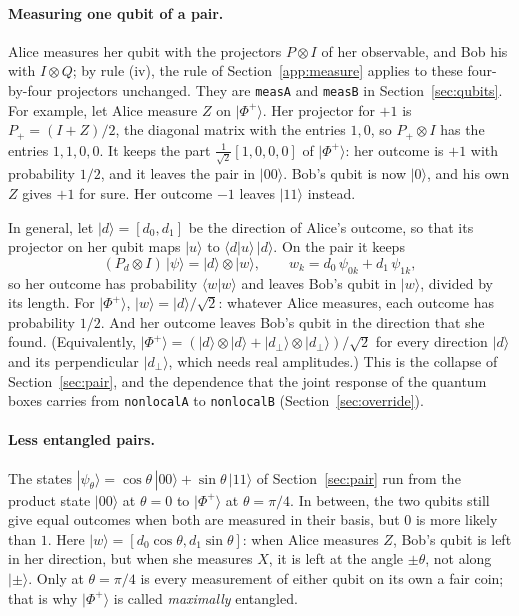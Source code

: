 \documentclass[11pt]{article}
\newcommand{\hs}{\lstinline[style=hask,basicstyle=\ttfamily,frame=none]}
\begin{document}
\paragraph{Measuring one qubit of a pair.} Alice measures her qubit with the projectors $P \otimes I$ of her observable, and Bob his with $I \otimes Q$; by rule (iv), the rule of Section~\ref{app:measure} applies to these four-by-four projectors unchanged. They are \hs|measA| and \hs|measB| in Section~\ref{sec:qubits}. For example, let Alice measure $Z$ on $|\Phi^+\rangle$. Her projector for $+1$ is $P_+ = (I + Z)/2$, the diagonal matrix with the entries $1, 0$, so $P_+ \otimes I$ has the entries $1, 1, 0, 0$. It keeps the part $\frac{1}{\sqrt2}[1, 0, 0, 0]$ of $|\Phi^+\rangle$: her outcome is $+1$ with probability $1/2$, and it leaves the pair in $|00\rangle$. Bob's qubit is now $|0\rangle$, and his own $Z$ gives $+1$ for sure. Her outcome $-1$ leaves $|11\rangle$ instead.

In general, let $|d\rangle = [d_0, d_1]$ be the direction of Alice's outcome, so that its projector on her qubit maps $|u\rangle$ to $\langle d|u\rangle\,|d\rangle$. On the pair it keeps
\[
  (P_d \otimes I)\,|\psi\rangle = |d\rangle \otimes |w\rangle, \qquad w_k = d_0\,\psi_{0k} + d_1\,\psi_{1k},
\]
so her outcome has probability $\langle w|w\rangle$ and leaves Bob's qubit in $|w\rangle$, divided by its length. For $|\Phi^+\rangle$, $|w\rangle = |d\rangle/\sqrt2$: whatever Alice measures, each outcome has probability $1/2$. And her outcome leaves Bob's qubit in the direction that she found. (Equivalently, $|\Phi^+\rangle = (|d\rangle \otimes |d\rangle + |d_\perp\rangle \otimes |d_\perp\rangle)/\sqrt2$ for every direction $|d\rangle$ and its perpendicular $|d_\perp\rangle$, which needs real amplitudes.) This is the collapse of Section~\ref{sec:pair}, and the dependence that the joint response of the quantum boxes carries from \hs|nonlocalA| to \hs|nonlocalB| (Section~\ref{sec:override}).

\paragraph{Less entangled pairs.} The states $|\psi_\theta\rangle = \cos\theta\,|00\rangle + \sin\theta\,|11\rangle$ of Section~\ref{sec:pair} run from the product state $|00\rangle$ at $\theta = 0$ to $|\Phi^+\rangle$ at $\theta = \pi/4$. In between, the two qubits still give equal outcomes when both are measured in their basis, but $0$ is more likely than $1$. Here $|w\rangle = [d_0\cos\theta, d_1\sin\theta]$: when Alice measures $Z$, Bob's qubit is left in her direction, but when she measures $X$, it is left at the angle $\pm\theta$, not along $|{\pm}\rangle$. Only at $\theta = \pi/4$ is every measurement of either qubit on its own a fair coin; that is why $|\Phi^+\rangle$ is called \emph{maximally} entangled.
\end{document}
